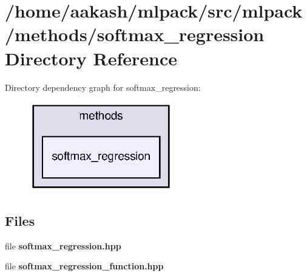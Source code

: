 \section{/home/aakash/mlpack/src/mlpack/methods/softmax\+\_\+regression Directory Reference}
\label{dir_ef6c2ad6ea2e7fbc564fdee0127eb9cb}
Directory dependency graph for softmax\+\_\+regression\+:
\nopagebreak
\begin{figure}[H]
\begin{center}
\leavevmode
\includegraphics[width=178pt]{dir_ef6c2ad6ea2e7fbc564fdee0127eb9cb_dep}
\end{center}
\end{figure}
\subsection*{Files}
\begin{DoxyCompactItemize}
\item 
file \textbf{ softmax\+\_\+regression.\+hpp}
\item 
file \textbf{ softmax\+\_\+regression\+\_\+function.\+hpp}
\end{DoxyCompactItemize}
